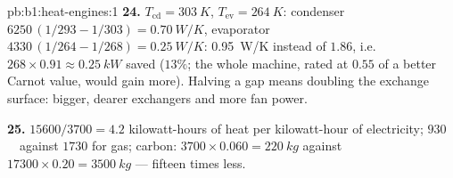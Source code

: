 \begin{solution}{pb:b1:heat-engines:1}
\textbf{24.} $T_{\mathrm{cd}} = \qty{303}{K}$, $T_{\mathrm{ev}} = \qty{264}{K}$:
condenser $6250\,(1/293 - 1/303) = \qty{0.70}{W/K}$, evaporator
$4330\,(1/264 - 1/268) = \qty{0.25}{W/K}$: \qty{0.95}{W/K} instead of
$1.86$, i.e.\ $268 \times 0.91 \approx \qty{0.25}{kW}$ saved ($13\%$; the
whole machine, rated at $0.55$ of a better Carnot value, would gain
more). Halving a gap means doubling the exchange surface: bigger,
dearer exchangers and more fan power.

\textbf{25.} $15600/3700 = 4.2$ kilowatt-hours of heat per kilowatt-hour
of electricity; $930$~\texteuro\ against $1730$ for gas; carbon: $3700
\times 0.060 = \qty{220}{kg}$ against $17300 \times 0.20 = \qty{3500}{kg}$ ---
fifteen times less.
\end{solution}
